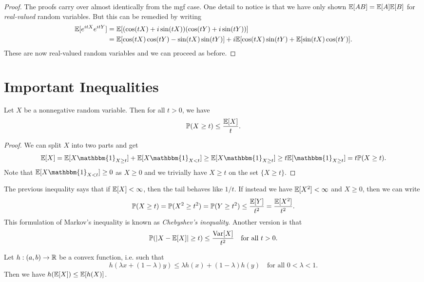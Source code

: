 \begin{proof}
  The proofs carry over almost identically from the
  mgf case. One detail to notice is that we have only
  shown $\mathbb{E}[AB] = \mathbb{E}[A] \mathbb{E}[B]$
  for \emph{real-valued} random variables.
  But this can be remedied by writing
  \begin{align*}
    \mathbb{E}[e^{itX} e^{itY}]
    &=\mathbb{E}[(\cos(tX) + i \sin(tX))(\cos(tY) + i \sin(tY))] \\
    &= \mathbb{E}[\cos(tX) \cos(tY) - \sin(tX) \sin(tY)] + i \mathbb{E}[\cos(tX) \sin(tY) + \mathbb{E}[\sin(tX) \cos(tY)].
  \end{align*}
  These are now real-valued random variables and
  we can proceed as before.
\end{proof}

\section{Important Inequalities}
\begin{theorem}
  Let $X$ be a nonnegative random variable. Then
  for all $t > 0$, we have
  \[
    \mathbb{P}(X \ge t) \le \frac{\mathbb{E}[X]}{t}.
  \]
\end{theorem}

\begin{proof}
  We can split $X$ into two parts and get
  \[
    \EE[X] = \EE[X \mathbbm{1}_{X \ge t}] + \EE[X \mathbbm{1}_{X < t}]
    \ge \EE[X \mathbbm{1}_{X \ge t}]
    \ge t \EE[\mathbbm{1}_{X \ge t}]
    = t \PP(X \ge t).
  \]
  Note that $\EE[X \mathbbm{1}_{X < t}] \ge 0$ as
  $X \ge 0$ and we trivially have
  $X \ge t$ on the set $\{X \ge t\}$.
\end{proof}

\begin{remark}
  The previous inequality says that if
  $\mathbb{E}[X] < \infty$, then the tail behaves like
  $1 / t$. If instead we have $\mathbb{E}[X^2] < \infty$
  and $X \ge 0$, then we can write
  \[
    \mathbb{P}(X \ge t) = \mathbb{P}(X^2 \ge t^2) = \mathbb{P}(Y \ge t^2)
    \le \frac{\mathbb{E}[Y]}{t^2} = \frac{\mathbb{E}[X^2]}{t^2}.
  \]
  This formulation of Markov's inequality is known
  as \emph{Chebyshev's inequality}. Another version is
  that
  \[
    \mathbb{P}(|X - \mathbb{E}[X]| \ge t) \le \frac{\operatorname{Var}[X]}{t^2}
    \quad \text{for all $t > 0$}.
  \]
\end{remark}

\begin{theorem}
  Let $h : (a, b) \to \mathbb{R}$ be a convex function,
  i.e. such that
  \[
    h(\lambda x + (1 - \lambda) y)
    \le \lambda h(x) + (1 - \lambda) h(y)
    \quad \text{for all $0 < \lambda < 1$.}
  \]
  Then we have $h(\mathbb{E}[X]) \le \mathbb{E}[h(X)]$.
\end{theorem}

